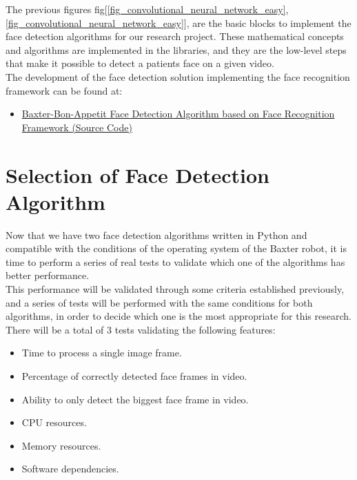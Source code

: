 \documentclass[11pt]{report} %
\begin{document}
The previous figures fig[\ref{fig_convolutional_neural_network_easy}, \ref{fig_convolutional_neural_network_easy}], are the basic blocks to implement the face detection algorithms for our research project. These mathematical concepts and algorithms are implemented in the libraries, and they are the low-level steps that make it possible to detect a patients face on a given video.\\

The development of the face detection solution implementing the face recognition framework can be found at:

\begin{itemize}
    \color{blue}
    \item \href{https://github.com/san99tiago/baxter-bon-appetit/tree/main/python/computer_vision/face_detect_face_recognition}{Baxter-Bon-Appetit Face Detection Algorithm based on Face Recognition Framework (Source Code)}
\end{itemize}


\section{Selection of Face Detection Algorithm}

Now that we have two face detection algorithms written in Python and compatible with the conditions of the operating system of the Baxter robot, it is time to perform a series of real tests to validate which one of the algorithms has better performance.\\

This performance will be validated through some criteria established previously, and a series of tests will be performed with the same conditions for both algorithms, in order to decide which one is the most appropriate for this research.\\

There will be a total of 3 tests validating the following features:

\begin{itemize}
    \item Time to process a single image frame.
    \item Percentage of correctly detected face frames in video.
    \item Ability to only detect the biggest face frame in video.
    \item CPU resources.
    \item Memory resources.
    \item Software dependencies.
\end{itemize}
\end{document}
